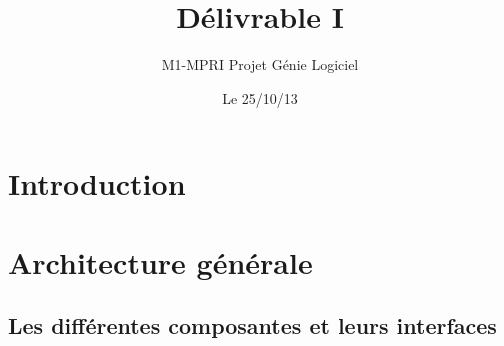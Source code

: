 \documentclass[a4paper,10pt]{article}
\author{M1-MPRI Projet Génie Logiciel}
\date{Le 25/10/13}
\title{Délivrable I
}
\begin{document}
\maketitle
\tableofcontents

\section{Introduction}
\section{Architecture générale}
\subsection{Les différentes composantes et leurs interfaces}
\end{document}
